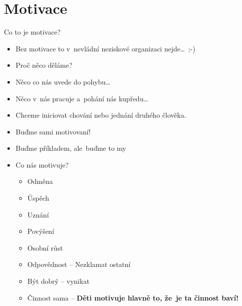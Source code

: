 \documentclass[compress,xelatex,xcolor=dvipsnames,print]{beamer}
\begin{document}
\section{Motivace}

\begin{frame}{Co to je motivace?}
\begin{multicols}{2}
\begin{itemize}
\item Bez motivace to v~nevládní neziskové organizaci nejde\ldots~;-)
\item Proč něco děláme?
\item Něco co nás uvede do pohybu\ldots
\item Něco v~nás pracuje a~pohání nás kupředu\ldots
\item Chceme iniciovat chování nebo jednání druhého člověka.
\item Buďme sami motivovaní!
\item Buďme příkladem, ale~buďme to my
\end{itemize}
\columnbreak
\begin{itemize}
\item Co nás motivuje?
 \begin{itemize}
 \item Odměna
 \item Úspěch
 \item Uznání
 \item Povýšení
 \item Osobní růst
 \item Odpovědnost -- Nezklamat ostatní
 \item Být dobrý -- vynikat
 \item Činnost sama -- \textbf{Děti motivuje hlavně to, že~je ta činnost baví!}
 \end{itemize}
\end{itemize}
\end{multicols}
\end{frame}
\end{document}
